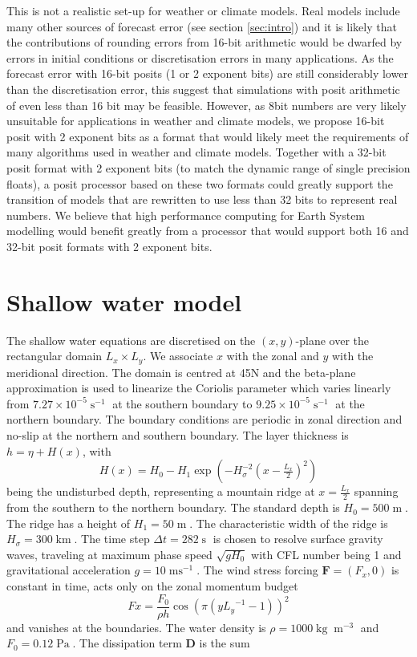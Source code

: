 \documentclass[draft]{agujournal2019}
\newcommand{\op}{\operatorname}
\begin{document}
This is not a realistic set-up for weather or climate models. Real models include many other sources of forecast error (see section \ref{sec:intro}) and it is likely that the contributions of rounding errors from 16-bit arithmetic would be dwarfed by errors in initial conditions or discretisation errors in many applications. As the forecast error with 16-bit posits (1 or 2 exponent bits) are still considerably lower than the discretisation error, this suggest that simulations with posit arithmetic of even less than 16 bit may be feasible. However, as 8bit numbers are very likely unsuitable for applications in weather and climate models, we propose 16-bit posit with 2 exponent bits as a format that would likely meet the requirements of many algorithms used in weather and climate models. Together with a 32-bit posit format with 2 exponent bits (to match the dynamic range of single precision floats), a posit processor based on these two formats could greatly support the transition of models that are rewritten to use less than 32 bits to represent real numbers. We believe that high performance computing for Earth System modelling would benefit greatly from a processor that would support both 16 and 32-bit posit formats with 2 exponent bits.

\appendix
\section{Shallow water model}
\label{sec:app}

The shallow water equations are discretised on the $(x,y)$-plane over the rectangular domain $L_x \times L_y$. We associate $x$ with the zonal and $y$ with the meridional direction. The domain is centred at 45N and the beta-plane approximation \cite{Vallis2006} is used to linearize the Coriolis parameter which varies linearly from $7.27 \times 10^{-5}\op{s}^{-1}$ at the southern boundary to $9.25 \times 10^{-5}\op{s}^{-1}$ at the northern boundary. The boundary conditions are periodic in zonal direction and no-slip at the northern and southern boundary. The layer thickness is $h = \eta + H(x)$, with
\begin{equation}
H(x) = H_0 - H_1\exp\left(-H_\sigma^{-2}(x-\tfrac{L_x}{2})^2\right)
\end{equation}
being the undisturbed depth, representing a mountain ridge at $x=\tfrac{L_x}{2}$ spanning from the southern to the northern boundary. The standard depth is $H_0 = 500\op{m}$. The ridge has a height of $H_1 = 50\op{m}$. The characteristic width of the ridge is $H_\sigma = 300\op{km}$. The time step $\Delta t = 282\op{s}$ is chosen to resolve surface gravity waves, traveling at maximum phase speed $\sqrt{gH_0}$ with CFL number being 1 and gravitational acceleration $g=10\op{ms}^{-1}$. The wind stress forcing $\mathbf{F} = (F_x,0)$ is constant in time, acts only on the zonal momentum budget
\begin{equation}
Fx = \frac{F_0}{\rho h} \cos\left(\pi\left(y{L_y}^{-1} - 1\right)\right)^2
\end{equation}
and vanishes at the boundaries. The water density is $\rho = 1000\op{kg}\op{m}^{-3}$ and $F_0 = 0.12\op{Pa}$. The dissipation term $\mathbf{D}$ is the sum
\end{document}
